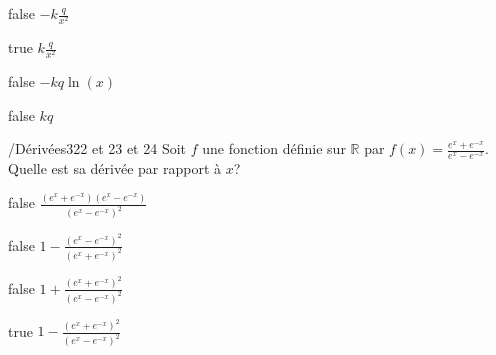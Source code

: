             \begin{reponses}
                \item[false] $-k\frac{q}{x^2}$
                \item[true] $k\frac{q}{x^2}$
                \item[false] $-kq\ln(x)$
                \item[false] $kq$
            \end{reponses}
        	\begin{question}{/}{Dérivées}{3}{22 et 23 et 24}
				Soit $f$ une fonction définie sur $\mathbb{R}$ par  $f(x)=\frac{e^x + e^{-x}}{e^x - e^{-x}}$. Quelle est sa dérivée par rapport à $x$?
            \end{question}
            \begin{reponses}
            	\item[false] $\frac{(e^x + e^{-x})(e^x - e^{-x})}{(e^x - e^{-x})^2}$
            	\item[false] $1-\frac{(e^x - e^{-x})^2}{(e^x + e^{-x})^2}$
                \item[false] $1+\frac{(e^x + e^{-x})^2}{(e^x - e^{-x})^2}$
                \item[true] $1-\frac{(e^x + e^{-x})^2}{(e^x - e^{-x})^2}$
            \end{reponses}
